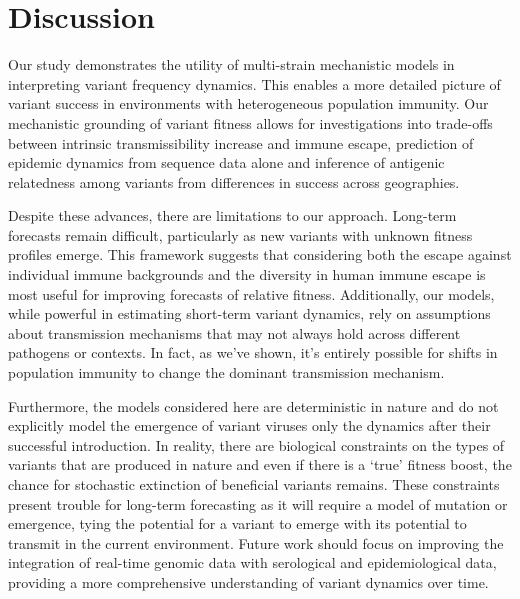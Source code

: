 \documentclass[11pt,oneside,letterpaper]{article}
\begin{document}
\section*{Discussion}

Our study demonstrates the utility of multi-strain mechanistic models in interpreting variant frequency dynamics.
This enables a more detailed picture of variant success in environments with heterogeneous population immunity.
Our mechanistic grounding of variant fitness allows for investigations into trade-offs between intrinsic transmissibility increase and immune escape, prediction of epidemic dynamics from sequence data alone and inference of antigenic relatedness among variants from differences in success across geographies.


Despite these advances, there are limitations to our approach.
Long-term forecasts remain difficult, particularly as new variants with unknown fitness profiles emerge.
This framework suggests that considering both the escape against individual immune backgrounds and the diversity in human immune escape is most useful for improving forecasts of relative fitness.
Additionally, our models, while powerful in estimating short-term variant dynamics, rely on assumptions about transmission mechanisms that may not always hold across different pathogens or contexts.
In fact, as we've shown, it's entirely possible for shifts in population immunity to change the dominant transmission mechanism.

Furthermore, the models considered here are deterministic in nature and do not explicitly model the emergence of variant viruses only the dynamics after their successful introduction.
In reality, there are biological constraints on the types of variants that are produced in nature and even if there is a `true' fitness boost, the chance for stochastic extinction of beneficial variants remains.
These constraints present trouble for long-term forecasting as it will require a model of mutation or emergence, tying the potential for a variant to emerge with its potential to transmit in the current environment.
Future work should focus on improving the integration of real-time genomic data with serological and epidemiological data, providing a more comprehensive understanding of variant dynamics over time.
\end{document}
